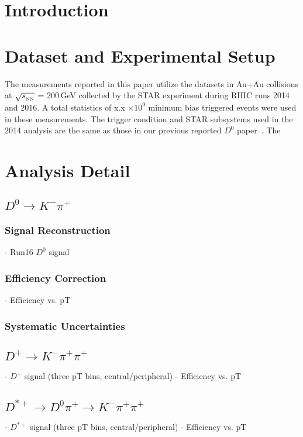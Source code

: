 \documentclass[%
 reprint,
 amsmath,amssymb,
 aps,
]{revtex4-1}
\begin{document}
\section{Introduction}
\label{sec:intro}

\section{Dataset and Experimental Setup}
\label{sec:dataset}
The measurements reported in this paper utilize the datasets in Au+Au collisions at $\sqrt{s_{_{\rm NN}}}$ = 200\,GeV collected by the STAR experiment during RHIC runs 2014 and 2016. A total statistics of x.x $\times10^9$ minimum bias triggered events were used in these measurements. The trigger condition and STAR subsystems used in the 2014 analysis are the same as those in our previous reported $D^0$ paper~\cite{}. The 


\section{Analysis Detail}

\subsection{$D^0\rightarrow K^-\pi^+$}
\label{sec:ana:D0}

\subsubsection{Signal Reconstruction}
- Run16 $D^0$ signal

\subsubsection{Efficiency Correction}
- Efficiency vs. pT

\subsubsection{Systematic Uncertainties}

\subsection{$D^+\rightarrow K^-\pi^+\pi^+$}
\label{sec:ana:Dplus}
- $D^+$ signal (three pT bins, central/peripheral)
- Efficiency vs. pT

\subsection{$D^{*+}\rightarrow D^0\pi^+\rightarrow K^-\pi^+\pi^+$}
\label{sec:ana:Dstar}
- $D^{*+}$ signal (three pT bins, central/peripheral)
- Efficiency vs. pT
\end{document}
